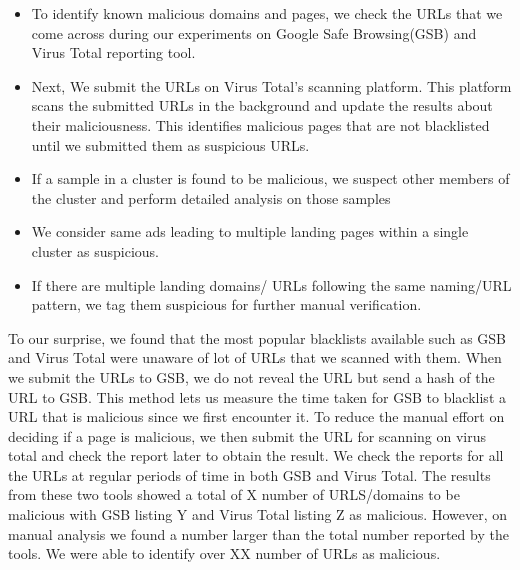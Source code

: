 \begin{itemize}
    \item To identify known malicious domains and pages, we check the URLs that we come across during our experiments on Google Safe Browsing(GSB) and Virus Total reporting tool.
    \item Next, We submit the URLs on Virus Total's scanning platform. This platform scans the submitted URLs in the background and update the results about their maliciousness. This identifies malicious pages that are not blacklisted until we submitted them as suspicious URLs.
    \item If a sample in a cluster is found to be malicious, we suspect other members of the cluster and perform detailed analysis on those samples
    \item We consider same ads leading to multiple landing pages within a single cluster as suspicious.
    \item If there are multiple landing domains/ URLs following the same naming/URL pattern, we tag them suspicious for further manual verification.
\end{itemize}
   
To our surprise, we found that the most popular blacklists available such as GSB and Virus Total were unaware of lot of URLs that we scanned with them. When we submit the URLs to GSB, we do not reveal the URL but send a hash of the URL to GSB. This method lets us measure the time taken for GSB to blacklist a URL that is malicious since we first encounter it. To reduce the manual effort on deciding if a page is malicious, we then submit the URL for scanning on virus total and check the report later to obtain the result. We check the reports for all the URLs at regular periods of time in both GSB and Virus Total. The results from these two tools showed a total of X number of URLS/domains to be malicious with GSB listing Y and Virus Total listing Z as malicious. However, on manual analysis we found a number larger than the total number reported by the tools. We were able to identify over XX number of URLs as malicious. 
